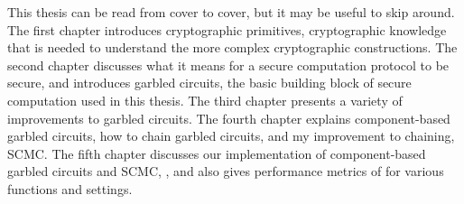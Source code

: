 This thesis can be read from cover to cover, but it may be useful to skip around.
The first chapter introduces cryptographic primitives, cryptographic knowledge that is needed to understand the more complex cryptographic constructions.
The second chapter discusses what it means for a secure computation protocol to be secure, and introduces garbled circuits, the basic building block of secure computation used in this thesis.
The third chapter presents a variety of improvements to garbled circuits.
The fourth chapter explains component-based garbled circuits, how to chain garbled circuits, and my improvement to chaining, SCMC.
The fifth chapter discusses our implementation of component-based garbled circuits and SCMC, \CompGC, and also gives performance metrics of \CompGC for various functions and settings.








